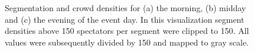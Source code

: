 \documentclass[12pt,a4paper,twoside,openright]{book}
\begin{document}
\begin{figure}
	\begin{center}
	\end{center}
	\caption[Segmentation and crowd densities]{Segmentation and crowd densities for (a) the morning, (b) midday and (c) the evening of the event day. In this visualization segment densities above 150 spectators per segment were clipped to 150. All values were subsequently divided by 150 and mapped to gray scale.}
	\label{fig:segments}
\end{figure}
\end{document}
